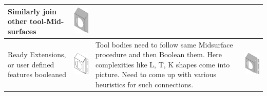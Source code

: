 \begin{longtable}{ L{0.18\textwidth} C{0.18\textwidth} L{0.38\textwidth}  C{0.18\textwidth}}
Similarly join other tool-Mid-surfaces &
\includegraphics[scale=0.23]{..//Common/images//DryRun51.png} \\
\hline
Ready Extensions, or user defined features booleaned  &
\includegraphics[scale=0.23]{..//Common/images//DryRun6.png} &
Tool bodies need to follow same Midsurface procedure and then Boolean them. Here complexities like L, T, K shapes come into picture. Need to come up with various heuristics for such connections.  &
\includegraphics[scale=0.25]{..//Common/images//DryRun61.png} \\
\hline

\end{longtable}
